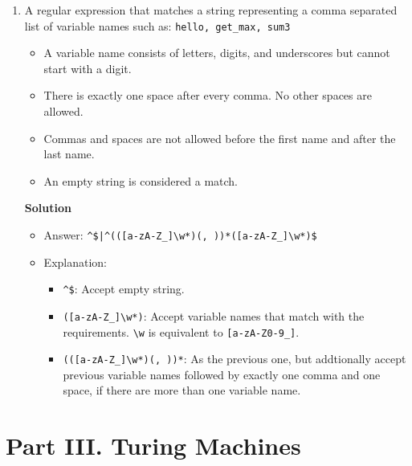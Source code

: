 \documentclass[12pt]{article}
\begin{document}
\begin{enumerate}
    \item A regular expression that matches a string representing a comma separated list of variable names such as: \texttt{hello, get\_max, sum3}

          \begin{itemize}
              \item A variable name consists of letters, digits, and underscores but cannot start with a digit.
              \item There is exactly one space after every comma. No other spaces are allowed.
              \item Commas and spaces are not allowed before the first name and after the last name.
              \item An empty string is considered a match.
          \end{itemize}

          \centerline{\textbf{Solution}}

          \begin{itemize}
              \item Answer: \texttt{\^}\texttt{\$|}\texttt{\^}\texttt{(([a-zA-Z\_]\textbackslash w*)(, ))*([a-zA-Z\_]\textbackslash w*)\$}
              \item Explanation:

                    \begin{itemize}
                        \item \texttt{\^}\texttt{\$}: Accept empty string.
                        \item \texttt{([a-zA-Z\_]\textbackslash w*)}: Accept variable names that match with the requirements. \texttt{\textbackslash w} is equivalent to \texttt{[a-zA-Z0-9\_]}.
                        \item \texttt{(([a-zA-Z\_]\textbackslash w*)(, ))*}: As the previous one, but addtionally accept previous variable names followed by exactly one comma and one space, if there are more than one variable name.
                    \end{itemize}
          \end{itemize}

\end{enumerate}

\newpage

\section*{Part III. Turing Machines}
\end{document}
